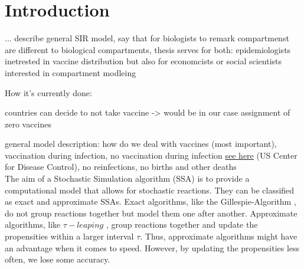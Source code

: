 \section{Introduction}
...
describe general SIR model, say that for biologists to remark compartmenst are different to biological compartments, thesis serves for both: epidemiologists inetrested in vaccine distribution but also for economcists or social scientists interested in compartment modleing 








How it's currently done:

countries can decide to not take vaccine -> would be in our case assignment of zero vaccines



general model description: how do we deal with vaccines (most important), vaccination during infection, no vaccination during infection \href{https://www.cdc.gov/vaccines/covid-19/info-by-product/clinical-considerations.html}{see here} (US Center for Disease Control), no reinfections, no births and other deaths\\


The aim of a Stochastic Simulation algorithm (SSA) is to provide a computational model that allows for stochastic reactions. They can be classified as exact and approximate SSAs. Exact algorithms, like the Gillespie-Algorithm \citep{Gillespie.1977}, do not group reactions together but model them one after another. Approximate algorithms, like $\tau-leaping$ \citep{Gillespie.2001}, group reactions together and update the propensities within a larger interval $\tau$. Thus, approximate algorithms might have an advantage when it comes to speed. However, by updating the propensities less often, we lose some accuracy. %